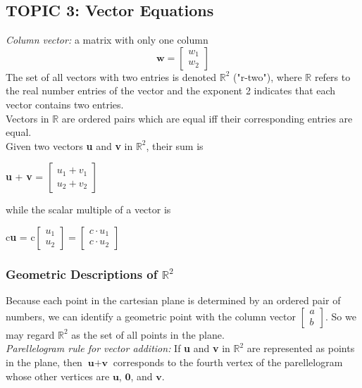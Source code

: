 \documentclass[12pt]{article} %
\newcommand{\R}{\mathbb{R}}
\begin{document}
\pagebreak
\subsection{TOPIC 3: Vector Equations}
\emph{Column vector:} a matrix with only one column
$$\mathbf{w}= \begin{bmatrix}
	w_1 \\ w_2 
\end{bmatrix}$$
The set of all vectors with two entries is denoted $\mathbb{R}^2$ ("r-two"), where $\mathbb{R}$ refers to the real number entries of the vector and the exponent 2 indicates that each vector contains two entries.\\
Vectors in $\mathbb{R}$ are ordered pairs which are equal iff their corresponding entries are equal.\\

Given two vectors \textbf{u} and \textbf{v} in $\R^2$, their sum is 
\begin{center}\textbf{u} + \textbf{v} = $\begin{bmatrix}u_1 + v_1 \\ u_2 + v_2\end{bmatrix}$\end{center}
while the scalar multiple of a vector is 
\begin{center}c\textbf{u} = c$\begin{bmatrix}u_1 \\ u_2\end{bmatrix} =\begin{bmatrix}c\cdot u_1 \\ c\cdot u_2\end{bmatrix}  $\end{center}

\subsubsection{Geometric Descriptions of $\R^2$}
Because each point in the cartesian plane is determined by an ordered pair of numbers, we can identify a geometric point with the column vector $\begin{bmatrix}a \\ b\end{bmatrix}$. So we may regard $\R^2$ as the set of all points in the plane.\\

\emph{Parellelogram rule for vector addition:} If \textbf{u} and \textbf{v} in $\R^2$ are represented as points in the plane, then $\textbf{u} + \textbf{v}$ corresponds to the fourth vertex of the parellelogram whose other vertices are $\textbf{u}$, $\textbf{0}$, and $\textbf{v}$.
\end{document}
